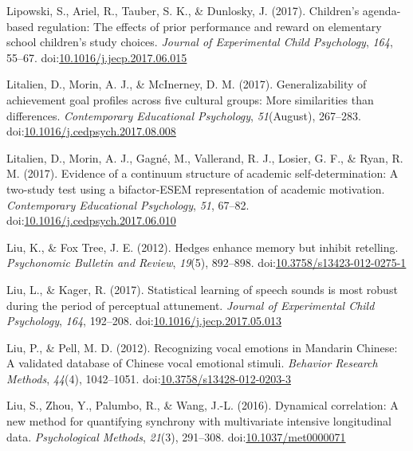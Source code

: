 \documentclass[english,man]{apa6}
\theoremstyle{definition}
\theoremstyle{definition}
\theoremstyle{definition}
\theoremstyle{remark}
\begin{document}
\hypertarget{ref-Lipowski2017}{}
Lipowski, S., Ariel, R., Tauber, S. K., \& Dunlosky, J. (2017).
Children's agenda-based regulation: The effects of prior performance and
reward on elementary school children's study choices. \emph{Journal of
Experimental Child Psychology}, \emph{164}, 55--67.
doi:\href{https://doi.org/10.1016/j.jecp.2017.06.015}{10.1016/j.jecp.2017.06.015}

\hypertarget{ref-Litalien2017a}{}
Litalien, D., Morin, A. J., \& McInerney, D. M. (2017). Generalizability
of achievement goal profiles across five cultural groups: More
similarities than differences. \emph{Contemporary Educational
Psychology}, \emph{51}(August), 267--283.
doi:\href{https://doi.org/10.1016/j.cedpsych.2017.08.008}{10.1016/j.cedpsych.2017.08.008}

\hypertarget{ref-Litalien2017}{}
Litalien, D., Morin, A. J., Gagné, M., Vallerand, R. J., Losier, G. F.,
\& Ryan, R. M. (2017). Evidence of a continuum structure of academic
self-determination: A two-study test using a bifactor-ESEM
representation of academic motivation. \emph{Contemporary Educational
Psychology}, \emph{51}, 67--82.
doi:\href{https://doi.org/10.1016/j.cedpsych.2017.06.010}{10.1016/j.cedpsych.2017.06.010}

\hypertarget{ref-Liu2012a}{}
Liu, K., \& Fox Tree, J. E. (2012). Hedges enhance memory but inhibit
retelling. \emph{Psychonomic Bulletin and Review}, \emph{19}(5),
892--898.
doi:\href{https://doi.org/10.3758/s13423-012-0275-1}{10.3758/s13423-012-0275-1}

\hypertarget{ref-Liu2017}{}
Liu, L., \& Kager, R. (2017). Statistical learning of speech sounds is
most robust during the period of perceptual attunement. \emph{Journal of
Experimental Child Psychology}, \emph{164}, 192--208.
doi:\href{https://doi.org/10.1016/j.jecp.2017.05.013}{10.1016/j.jecp.2017.05.013}

\hypertarget{ref-Liu2012}{}
Liu, P., \& Pell, M. D. (2012). Recognizing vocal emotions in Mandarin
Chinese: A validated database of Chinese vocal emotional stimuli.
\emph{Behavior Research Methods}, \emph{44}(4), 1042--1051.
doi:\href{https://doi.org/10.3758/s13428-012-0203-3}{10.3758/s13428-012-0203-3}

\hypertarget{ref-Liu2016a}{}
Liu, S., Zhou, Y., Palumbo, R., \& Wang, J.-L. (2016). Dynamical
correlation: A new method for quantifying synchrony with multivariate
intensive longitudinal data. \emph{Psychological Methods}, \emph{21}(3),
291--308.
doi:\href{https://doi.org/10.1037/met0000071}{10.1037/met0000071}
\end{document}
